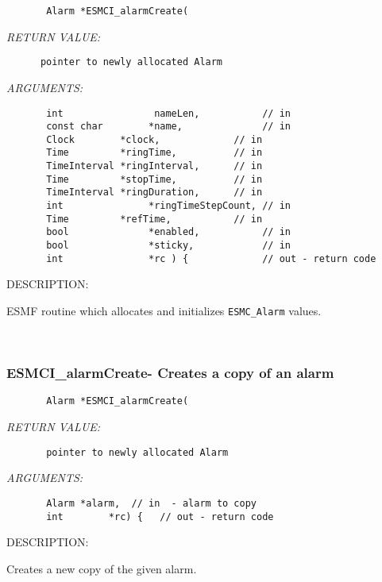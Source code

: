   
\begin{verbatim}       Alarm *ESMCI_alarmCreate(\end{verbatim}{\em RETURN VALUE:}
\begin{verbatim}      pointer to newly allocated Alarm\end{verbatim}{\em ARGUMENTS:}
\begin{verbatim}       int                nameLen,           // in
       const char        *name,              // in
       Clock        *clock,             // in
       Time         *ringTime,          // in
       TimeInterval *ringInterval,      // in
       Time         *stopTime,          // in
       TimeInterval *ringDuration,      // in
       int               *ringTimeStepCount, // in
       Time         *refTime,           // in
       bool              *enabled,           // in
       bool              *sticky,            // in
       int               *rc ) {             // out - return code\end{verbatim}
{\sf DESCRIPTION:\\ }


        ESMF routine which allocates and initializes {\tt ESMC\_Alarm} values.
   
 
\mbox{}\hrulefill\ 
 
\subsubsection [ESMCI\_alarmCreate-] {ESMCI\_alarmCreate- Creates a copy of an alarm}


  
\begin{verbatim}       Alarm *ESMCI_alarmCreate(\end{verbatim}{\em RETURN VALUE:}
\begin{verbatim}       pointer to newly allocated Alarm\end{verbatim}{\em ARGUMENTS:}
\begin{verbatim}       Alarm *alarm,  // in  - alarm to copy
       int        *rc) {   // out - return code 
 \end{verbatim}
{\sf DESCRIPTION:\\ }


        Creates a new copy of the given alarm.
   
 
